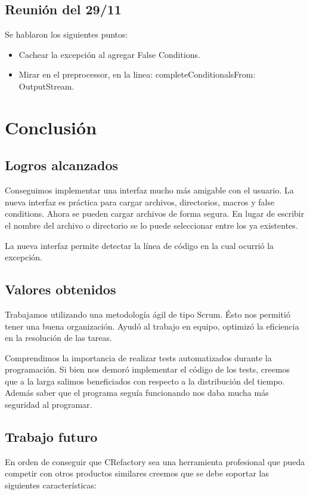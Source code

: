 \documentclass[a4paper,oneside,10pt]{article}
\begin{document}
\subsection{Reuni\'on del 29/11}
Se hablaron los siguientes puntos:
\begin{itemize}
\item Cachear la excepci\'on al agregar False Conditions. 
\item Mirar en el preprocessor, en la linea: completeConditionalsFrom: OutputStream.
\end{itemize}

\section{Conclusi\'on}

\subsection{Logros alcanzados}
Conseguimos implementar una interfaz mucho más amigable con el usuario. La nueva interfaz es práctica para cargar archivos, directorios, macros y false conditions. Ahora se pueden cargar archivos de forma segura. En lugar de escribir el nombre del archivo o directorio se lo puede seleccionar entre los ya existentes. 

La nueva interfaz permite detectar la línea de código en la cual ocurrió la excepción.


\subsection{Valores obtenidos}
Trabajamos utilizando una metodología \'agil de tipo Scrum. Ésto nos permiti\'o tener una buena organizaci\'on. Ayud\'o al trabajo en equipo, optimiz\'o la eficiencia en la resoluci\'on de las tareas.

Comprendimos la importancia de realizar tests automatizados durante la programaci\'on. Si bien nos demor\'o implementar el c\'odigo de los tests, creemos que a la larga salimos beneficiados con respecto a la distribuci\'on del tiempo. Además saber que el programa segu\'ia funcionando nos daba mucha más seguridad al programar.

\subsection{Trabajo futuro}
En orden de conseguir que CRefactory sea una herramienta profesional que pueda competir con otros productos similares creemos que se debe soportar las siguientes caracter\'isticas:
\end{document}

